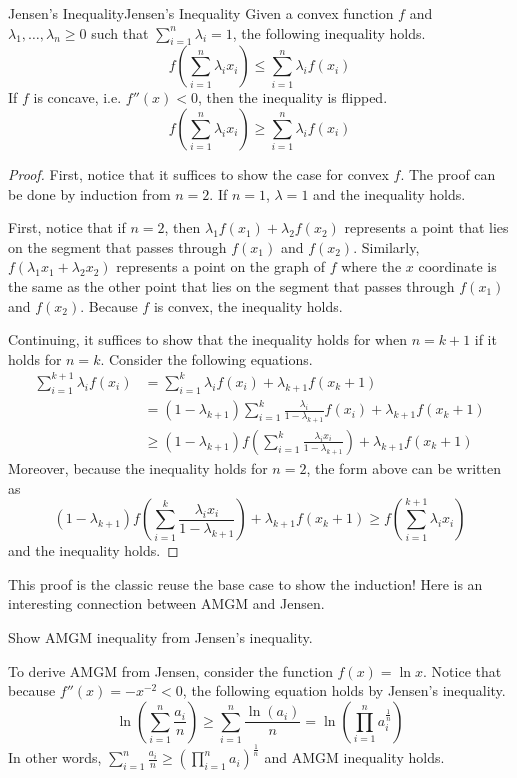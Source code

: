 \documentclass[../../../main.tex]{subfiles}
\begin{document}
\begin{theorem}{Jensen's Inequality}{Jensen's Inequality}
Given a convex function $f$ and $\lambda_1, \ldots, \lambda_n \geq 0$
such that $\sum_{i=1}^n \lambda_i = 1$, the following inequality
holds.
\[
f \left( \sum_{i=1}^n \lambda_i x_i \right)
\leq \sum_{i=1}^n \lambda_i f(x_i)
\]
If $f$ is concave, i.e. $f''(x) < 0$, then the inequality is flipped.
\[
f \left( \sum_{i=1}^n \lambda_i x_i \right)
\geq \sum_{i=1}^n \lambda_i f(x_i)
\]
\end{theorem}
\begin{proof}
First, notice that it suffices to show the case for convex $f$.
The proof can be done by induction from $n = 2$. If $n = 1$,
$\lambda = 1$ and the inequality holds.

First, notice that if $n = 2$, then $\lambda_1 f(x_1) + \lambda_2
f(x_2)$ represents a point that lies on the segment that passes
through $f(x_1)$ and $f(x_2)$. Similarly, $f(\lambda_1 x_1 +
\lambda_2 x_2)$ represents a point on the graph of $f$ where the
$x$ coordinate is the same as the other point that lies on the
segment that passes through $f(x_1)$ and $f(x_2)$. Because $f$ is
convex, the inequality holds.

Continuing, it suffices to show that the inequality holds for when
$n = k + 1$ if it holds for $n = k$. Consider the following equations.
\begin{align*}
    \sum_{i=1}^{k+1} \lambda_i f(x_i)
    &= \sum_{i=1}^k \lambda_i f(x_i) + \lambda_{k+1} f(x_k + 1) \\
    &= (1 - \lambda_{k+1}) \sum_{i=1}^k
        \frac{\lambda_i}{1 - \lambda_{k+1}} f(x_i)
        + \lambda_{k+1} f(x_k + 1) \\
    &\geq (1 - \lambda_{k+1}) f \left(
        \sum_{i=1}^k \frac{\lambda_i x_i}{1 - \lambda_{k+1}}
    \right) + \lambda_{k+1} f(x_k + 1)
\end{align*}
Moreover, because the inequality holds for $n = 2$, the form above
can be written as
\[
(1 - \lambda_{k+1}) f \left(
    \sum_{i=1}^k \frac{\lambda_i x_i}{1 - \lambda_{k+1}}
\right) + \lambda_{k+1} f(x_k + 1)
\geq f \left( \sum_{i=1}^{k+1} \lambda_i x_i \right)
\]
and the inequality holds.
\end{proof}

This proof is the classic reuse the base case to show the induction!
Here is an interesting connection between AMGM and Jensen.

\begin{problem}{}{}
Show AMGM inequality from Jensen's inequality.
\end{problem}
\begin{solution}
To derive AMGM from Jensen, consider the function $f(x) = \ln x$.
Notice that because $f''(x) = -x^{-2} < 0$, the following equation
holds by Jensen's inequality.
\[
\ln \left( \sum_{i=1}^n \frac{a_i}{n} \right)
\geq \sum_{i=1}^n \frac{\ln(a_i)}{n}
= \ln \left( \prod_{i=1}^n a_i^\frac{1}{n} \right)
\]
In other words, $\sum_{i=1}^n \frac{a_i}{n} \geq \left(
\prod_{i=1}^n a_i \right)^\frac{1}{n}$ and AMGM inequality holds.
\end{solution}
\end{document}
